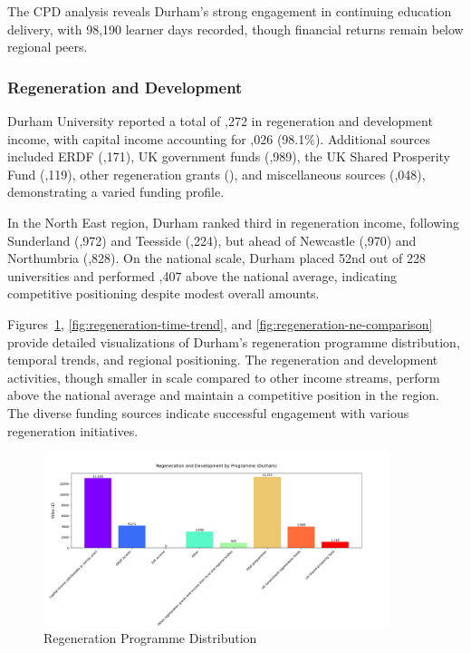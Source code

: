 \documentclass[journal,onecolumn, 10pt,draftclsnofoot]{IEEEtran}
\begin{document}
The CPD analysis reveals Durham's strong engagement in continuing education delivery, with 98,190 learner days recorded, though financial returns remain below regional peers.

\subsubsection{Regeneration and Development}

Durham University reported a total of ,272 in regeneration and development income, with capital income accounting for ,026 (98.1\%). Additional sources included ERDF (,171), UK government funds (,989), the UK Shared Prosperity Fund (,119), other regeneration grants (), and miscellaneous sources (,048), demonstrating a varied funding profile.

In the North East region, Durham ranked third in regeneration income, following Sunderland (,972) and Teesside (,224), but ahead of Newcastle (,970) and Northumbria (,828). On the national scale, Durham placed 52nd out of 228 universities and performed ,407 above the national average, indicating competitive positioning despite modest overall amounts.

Figures~\ref{fig:regeneration-programme}, \ref{fig:regeneration-time-trend}, and \ref{fig:regeneration-ne-comparison} provide detailed visualizations of Durham's regeneration programme distribution, temporal trends, and regional positioning. The regeneration and development activities, though smaller in scale compared to other income streams, perform above the national average and maintain a competitive position in the region. The diverse funding sources indicate successful engagement with various regeneration initiatives.

\begin{figure}[h]
\centering
\includegraphics[width=0.9\textwidth]{Fig/figure14.regeneration_programme.png}
\caption{Regeneration Programme Distribution}
\label{fig:regeneration-programme}
\end{figure}
\end{document}
